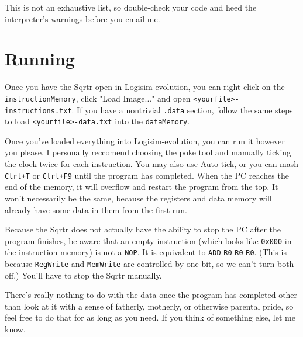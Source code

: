 \documentclass[12pt, oneside]{memoir}
\newcommand{\R}[1]{{\color{register}\texttt{R#1}}}
\newcommand{\instruction}[1]{{\color{instruction}\texttt{#1}}}
\newcommand{\header}[1]{{\color{header}\texttt{#1}}}
\begin{document}
This is not an exhaustive list, so double-check your code and heed the interpreter's warnings before you email me.



\chapter{Running}
Once you have the Sqrtr open in Logisim-evolution, you can right-click on the \texttt{instructionMemory}, click "Load Image..." and open \texttt{<yourfile>-instructions.txt}. If you have a nontrivial \header{.data} section, follow the same steps to load \texttt{<yourfile>-data.txt} into the \texttt{dataMemory}.

Once you've loaded everything into Logisim-evolution, you can run it however you please. I personally reccomend choosing the poke tool and manually ticking the clock twice for each instruction. You may also use Auto-tick, or you can mash \texttt{Ctrl+T} or \texttt{Ctrl+F9} until the program has completed. When the PC reaches the end of the memory, it will overflow and restart the program from the top. It won't necessarily be the same, because the registers and data memory will already have some data in them from the first run. 

Because the Sqrtr does not actually have the ability to stop the PC after the program finishes, be aware that an empty instruction (which looks like \texttt{0x000} in the instruction memory) is not a \instruction{NOP}. It is equivalent to \instruction{ADD} \R{0} \R{0} \R{0}. (This is because \texttt{RegWrite} and \texttt{MemWrite} are controlled by one bit, so we can't turn both off.) You'll have to stop the Sqrtr manually.

There's really nothing to do with the data once the program has completed other than look at it with a sense of fatherly, motherly, or otherwise parental pride, so feel free to do that for as long as you need. If you think of something else, let me know.
\end{document}
